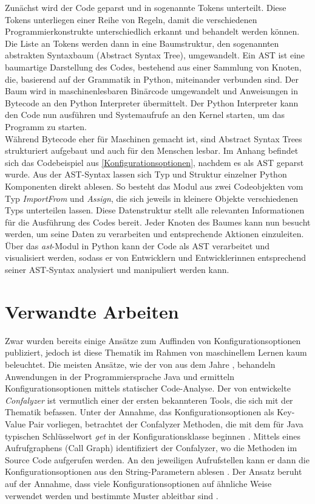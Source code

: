 \documentclass[german,bachelor]{swsLeipzig}
\begin{document}
Zunächst wird der Code geparst und in sogenannte Tokens unterteilt.
Diese Tokens unterliegen einer Reihe von Regeln, damit die verschiedenen Programmierkonstrukte unterschiedlich erkannt
und behandelt werden können.
Die Liste an Tokens werden dann in eine Baumstruktur, den sogenannten abstrakten Syntaxbaum (Abstract Syntax Tree), umgewandelt.
Ein AST ist eine baumartige Darstellung des Codes, bestehend aus einer Sammlung von Knoten, die, basierend auf der Grammatik
in Python, miteinander verbunden sind.
Der Baum wird in maschinenlesbaren Binärcode umgewandelt und Anweisungen in Bytecode an den Python Interpreter übermittelt.
Der Python Interpreter kann den Code nun ausführen und Systemaufrufe an den Kernel starten, um das Programm zu starten. \\

Während Bytecode eher für Maschinen gemacht ist, sind Abstract Syntax Trees strukturiert aufgebaut und auch für den Menschen lesbar.
Im Anhang befindet sich das Codebeispiel aus \ref{Konfigurationsoptionen}, nachdem es als AST geparst wurde.
Aus der AST-Syntax lassen sich Typ und Struktur einzelner Python Komponenten direkt ablesen.
So besteht das Modul aus zwei Codeobjekten vom Typ \textit{ImportFrom} und \textit{Assign}, die sich jeweils in kleinere
Objekte verschiedenen Typs unterteilen lassen.
Diese Datenstruktur stellt alle relevanten Informationen für die Ausführung des Codes bereit.
Jeder Knoten des Baumes kann nun besucht werden, um seine Daten zu verarbeiten und entsprechende Aktionen einzuleiten.
Über das \textit{ast}-Modul in Python kann der Code als AST verarbeitet und visualisiert werden, sodass er von
Entwicklern und Entwicklerinnen entsprechend seiner AST-Syntax analysiert und manipuliert werden kann.\\


\section{Verwandte Arbeiten}
Zwar wurden bereits einige Ansätze zum Auffinden von Konfigurationsoptionen publiziert, jedoch ist diese Thematik im Rahmen von
maschinellem Lernen kaum beleuchtet.
Die meisten Ansätze, wie der von \citeauthor{10.1145/1985793.1985812} aus dem Jahre \citeyear{10.1145/1985793.1985812},
behandeln Anwendungen in der Programmiersprache Java und ermitteln Konfigurationsoptionen mittels statischer Code-Analyse.
Der von \citeauthor{10.1145/1985793.1985812} entwickelte \textit{Confalyzer} ist vermutlich einer der ersten bekannteren
Tools, die sich mit der Thematik befassen.
Unter der Annahme, das Konfigurationsoptionen als Key-Value Pair vorliegen, betrachtet der Confalyzer Methoden, die mit
dem für Java typischen Schlüsselwort \textit{get} in der Konfigurationsklasse beginnen \cite[S. 131]{10.1145/1985793.1985812}.
Mittels eines Aufrufgraphens (Call Graph) identifiziert der Confalyzer, wo die Methoden im Source Code aufgerufen werden.
An den jeweiligen Aufrufstellen kann er dann die Konfigurationsoptionen aus den String-Parametern ablesen \cite[S. 131]{10.1145/1985793.1985812}.
Der Ansatz beruht auf der Annahme, dass viele Konfigurationsoptionen auf ähnliche Weise verwendet werden und bestimmte
Muster ableitbar sind \cite[S. 131]{10.1145/1985793.1985812}.\\
\end{document}
